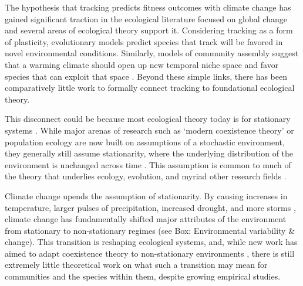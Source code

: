\documentclass[11pt,letterpaper]{article}
\begin{document}
The hypothesis that tracking predicts fitness outcomes with climate change has gained significant traction in the ecological literature focused on global change \citep[e.g.,][]{Cleland:2012} and several areas of ecological theory support it. Considering tracking as a form of plasticity, evolutionary models predict species that track will be favored in novel environmental conditions. Similarly, models of community assembly suggest that a warming climate should open up new temporal niche space and favor species that can exploit that space \citep{gotelli1996,wolkovich:2010fee,Zettlemoyer2019}. Beyond these simple links, there has been comparatively little work to formally connect tracking to foundational ecological theory. %

This disconnect could be because most ecological theory today is for stationary systems \citep[e.g.,][]{Sale:1977oq,Chesson:1997dz}. While major arenas of research such as `modern coexistence theory' or population ecology are now built on assumptions of a stochastic environment, they generally still assume stationarity, where the underlying distribution of the environment is unchanged across time \citep[i.e., constant mean and variance,][]{barabas2018}. This assumption is common to much of the theory that underlies ecology, evolution, and myriad other research fields \citep[e.g.,][]{Milly:2008yu,nosenko2013}. 

Climate change upends the assumption of stationarity. By causing increases in temperature, larger pulses of precipitation, increased drought, and more storms \citep{ipcc2013}, climate change has fundamentally shifted major attributes of the environment from stationary to non-stationary regimes (see Box: Environmental variability \& change). This transition is reshaping ecological systems, and, while new work has aimed to adapt coexistence theory to non-stationary environments \citep{chessonnonstat}, there is still extremely little theoretical work on what such a transition may mean for communities and the species within them, despite growing empirical studies.  %
\end{document}
